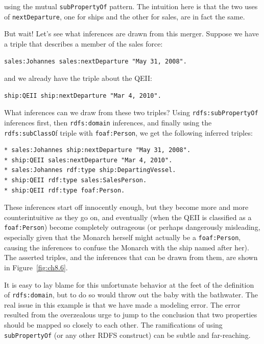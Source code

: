 using the mutual \texttt{subPropertyOf} pattern. The intuition here is that the
two uses of
\texttt{nextDeparture}, one for ships and the other for sales, are in fact the
same.

But wait! Let's see what inferences are drawn from this merger. Suppose
we have a triple that describes a member of the sales force:

\begin{lstlisting}
sales:Johannes sales:nextDeparture "May 31, 2008".
\end{lstlisting}

and we already have the triple about the QEII:

\begin{lstlisting}
ship:QEII ship:nextDeparture "Mar 4, 2010".
\end{lstlisting}

What inferences can we draw from these two triples? Using
\texttt{rdfs:subPropertyOf} inferences first, then \texttt{rdfs:domain} inferences, and
finally using the \texttt{rdfs:subClassO}f triple with \texttt{foaf:Person}, we get the
following inferred triples:

\begin{lstlisting}
* sales:Johannes ship:nextDeparture "May 31, 2008".
* ship:QEII sales:nextDeparture "Mar 4, 2010".
* sales:Johannes rdf:type ship:DepartingVessel.
* ship:QEII rdf:type sales:SalesPerson.
* ship:QEII rdf:type foaf:Person.
\end{lstlisting}


These inferences start off innocently enough, but they become more and
more counterintuitive as they go on, and eventually (when the QEII is
classified as a \texttt{foaf:Person}) become completely outrageous (or perhaps
dangerously misleading, especially given that the Monarch herself might
actually be a \texttt{foaf:Person}, causing the inferences to confuse the Monarch
with the ship named after her). The asserted triples, and the inferences
that can be drawn from them, are shown in Figure~\ref{fig:ch8.6}.

It is easy to lay blame for this unfortunate behavior at the feet of the
definition of \texttt{rdfs:domain}, but to do so would throw out the baby with
the bathwater. The real issue in this example is that we have made a
modeling error. The error resulted from the overzealous urge to jump to
the conclusion that two properties should be mapped so closely to each
other. The ramifications of using \texttt{subPropertyOf} (or any other RDFS
construct) can be subtle and far-reaching.

